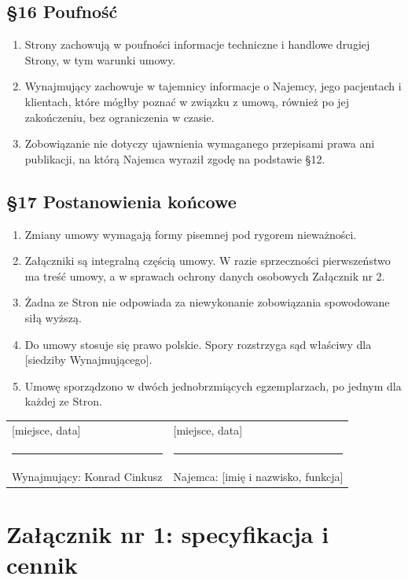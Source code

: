 \documentclass[11pt,a4paper]{article}
\begin{document}
\subsection*{§16 Poufność}
\begin{enumerate}
\item Strony zachowują w poufności informacje techniczne i handlowe drugiej Strony, w tym warunki umowy.
\item Wynajmujący zachowuje w tajemnicy informacje o Najemcy, jego pacjentach i klientach, które mógłby poznać w związku z umową, również po jej zakończeniu, bez ograniczenia w czasie.
\item Zobowiązanie nie dotyczy ujawnienia wymaganego przepisami prawa ani publikacji, na którą Najemca wyraził zgodę na podstawie §12.
\end{enumerate}

\subsection*{§17 Postanowienia końcowe}
\begin{enumerate}
\item Zmiany umowy wymagają formy pisemnej pod rygorem nieważności.
\item Załączniki są integralną częścią umowy. W razie sprzeczności pierwszeństwo ma treść umowy, a w sprawach ochrony danych osobowych Załącznik nr 2.
\item Żadna ze Stron nie odpowiada za niewykonanie zobowiązania spowodowane siłą wyższą.
\item Do umowy stosuje się prawo polskie. Spory rozstrzyga sąd właściwy dla [siedziby Wynajmującego].
\item Umowę sporządzono w dwóch jednobrzmiących egzemplarzach, po jednym dla każdej ze Stron.
\end{enumerate}

\vspace{1.5cm}
\begin{tabularx}{\linewidth}{@{}XX@{}}
[miejsce, data] & [miejsce, data] \\[2.2cm]
\hrule & \hrule \\
Wynajmujący: Konrad Cinkusz & Najemca: [imię i nazwisko, funkcja] \\
\end{tabularx}

\clearpage
\section*{Załącznik nr 1: specyfikacja i cennik}
\end{document}
